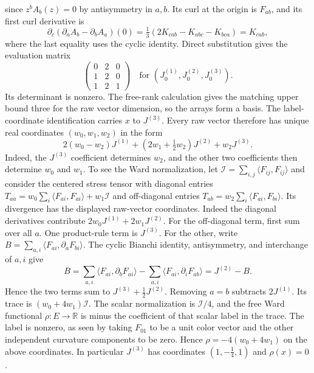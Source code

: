 since $z^bA_b(z)=0$ by antisymmetry in $a,b$. Its curl at the origin
is $F_{ab}$, and its first curl derivative is
\[
 \partial_c(\partial_aA_b-\partial_bA_a)(0)
 =\tfrac13(2K_{cab}-K_{abc}-K_{bca})=K_{cab},
\]
where the last equality uses the cyclic identity. Direct substitution gives
the evaluation matrix
\[
 \begin{pmatrix}0&2&0\\1&2&0\\1&2&1\end{pmatrix}
 \quad\text{for }(J^{(1)}_0,J^{(2)}_0,J^{(3)}_0).
\]
Its determinant is nonzero. The free-rank calculation gives the matching
upper bound three for the raw vector dimension, so the arrays form a basis.
The label-coordinate identification carries $x$ to $J^{(3)}$. Every raw vector
therefore has unique real coordinates $(w_0,w_1,w_2)$ in the form
\[
 2(w_0-w_2)J^{(1)}+(2w_1+\tfrac12w_2)J^{(2)}+w_2J^{(3)}.
\]
Indeed, the $J^{(3)}$ coefficient determines $w_2$, and the other two
coefficients then determine $w_0$ and $w_1$.
To see the Ward normalization, let $\mathcal I=\sum_{i,j}\langle F_{ij},F_{ij}\rangle$
and consider the centered stress tensor with diagonal entries
$T_{aa}=w_0\sum_i\langle F_{ai},F_{ai}\rangle+w_1\mathcal I$ and off-diagonal
entries $T_{ab}=w_2\sum_i\langle F_{ai},F_{bi}\rangle$. Its divergence
has the displayed raw-vector coordinates. Indeed the diagonal derivatives
contribute $2w_0J^{(1)}+2w_1J^{(2)}$. For the off-diagonal term, first
sum over all $a$. One product-rule term is $J^{(3)}$. For the other, write
$B=\sum_{a,i}\langle F_{ai},\partial_aF_{bi}\rangle$. The cyclic Bianchi
identity, antisymmetry, and interchange of $a,i$ give
\[
 B=\sum_{a,i}\langle F_{ai},\partial_bF_{ai}\rangle
    -\sum_{a,i}\langle F_{ai},\partial_iF_{ab}\rangle
  =J^{(2)}-B.
\]
Hence the two terms sum to $J^{(3)}+\tfrac12J^{(2)}$. Removing $a=b$
subtracts $2J^{(1)}$.
Its trace is $(w_0+4w_1)\mathcal I$. The scalar normalization is $\mathcal I/4$, and the
free Ward functional $\rho:E\to\mathbb R$ is minus the coefficient of
that scalar label in the trace. The label is nonzero, as seen by taking
$F_{01}$ to be a unit color vector and the other independent curvature
components to be zero. Hence $\rho=-4(w_0+4w_1)$ on the above coordinates. In
particular $J^{(3)}$ has coordinates $(1,-\tfrac14,1)$ and $\rho(x)=0$.

